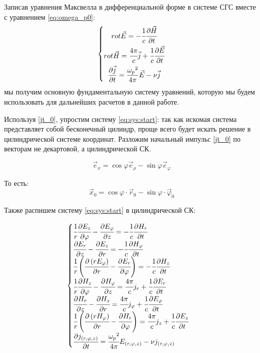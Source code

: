 \documentclass[a4paper]{article}
\begin{document}
Записав уравнения Максвелла в дифференциальной форме в системе СГС вместе с уравнением \eqref{eq:omega_p0}:
\begin{equation}
	\left\{ 
	\begin{gathered}
		rot\vec{E}=-\cfrac{1}{c}\cfrac{\partial\vec{H}}{\partial t} \\
		rot\vec{H}=\cfrac{4\pi}{c}\vec{j}+\cfrac{1}{c}\cfrac{\partial\vec{E}}{\partial t} \\
		\dfrac{\partial\vec{j}}{\partial t}=\frac{{\omega_{p}}^{2}}{4\pi}\vec{E}-\nu\vec{j}
	\end{gathered}
	\right.		
	\label{eq:sys:start}
\end{equation}
мы получим основную фундаментальную систему уравнений, которую мы будем использовать для дальнейших расчетов в данной работе.

Используя \eqref{jt_0}, упростим систему \eqref{eq:sys:start}: так как искомая система представляет собой бесконечный цилиндр, проще всего будет искать решение в цилиндрической системе координат. Разложим начальный импульс \eqref{jt_0} по векторам не декартовой, а цилиндрической СК.

\begin{equation}
	{\vec {e}}_{x}=\cos \varphi {\vec {e}}_{\rho }-\sin \varphi {\vec {e}}_{\varphi }
\end{equation}

То есть:
\begin{equation}\label{x:to:cill}
	\vec{x}_{0}=\cos\varphi\cdot\vec{r}_{0}-\sin\varphi\cdot\vec{\varphi}_{0}
\end{equation}

Также распишем систему \eqref{eq:sys:start} в цилиндрической СК:

\begin{equation}\label{eq:maxwell_2}
	\begin{cases}
		\cfrac{1}{r}\cfrac{\partial E_{z}}{\partial\varphi}-\cfrac{\partial E_{\varphi}}{\partial z}=-\cfrac{1}{c}\cfrac{\partial H_{r}}{\partial t}\\
		\cfrac{\partial E_{r}}{\partial z}-\cfrac{\partial E_{z}}{\partial r}=-\cfrac{1}{c}\cfrac{\partial H_{\varphi}}{\partial t}\\
		\cfrac{1}{r}\left(\cfrac{\partial\left(rE_{\varphi}\right)}{\partial r}-\cfrac{\partial E_{r}}{\partial\varphi}\right)=-\cfrac{1}{c}\cfrac{\partial H_{z}}{\partial t}\\
		\cfrac{1}{r}\cfrac{\partial H_{z}}{\partial\varphi}-\cfrac{\partial H_{\varphi}}{\partial z}=\cfrac{4\pi}{c}j_{r}+\cfrac{1}{c}\cfrac{\partial E_{r}}{\partial t}\\
		\cfrac{\partial H_{r}}{\partial z}-\cfrac{\partial H_{z}}{\partial r}=\cfrac{4\pi}{c}j_{\varphi}+\cfrac{1}{c}\cfrac{\partial E_{\varphi}}{\partial t}\\
		\cfrac{1}{r}\left(\cfrac{\partial\left(rH_{\varphi}\right)}{\partial r}-\cfrac{\partial H_{r}}{\partial\varphi}\right)=\cfrac{4\pi}{c}j_{z}+\cfrac{1}{c}\cfrac{\partial E_{z}}{\partial t}\\
		\cfrac{\partial{j_{(r,\varphi,z)}}}{\partial t}=\cfrac{{\omega_{p}}^{2}}{4\pi}{E_{(r,\varphi,z)}}-\nu{j_{(r,\varphi,z)}}
	\end{cases}
\end{equation}
\end{document}
